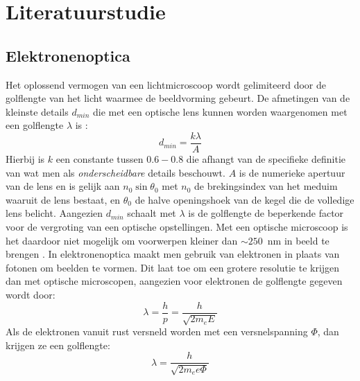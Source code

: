 \documentclass[we,twoside,openright,a4paper,11pt]{uantwerpenbamathesis}
\begin{document}
\chapter{Literatuurstudie}\label{ch:literatuur}
\section{Elektronenoptica}
Het oplossend vermogen van een lichtmicroscoop wordt gelimiteerd door de golflengte van het licht waarmee de beeldvorming gebeurt. De afmetingen van de kleinste details $d_{min}$ die met een optische lens kunnen worden waargenomen met een golflengte $\lambda$ is \cite{PWHawkes}:
\begin{equation}\label{eq:d_min}
    d_{min}=\frac{k\lambda}{A}
\end{equation}
Hierbij is $k$ een constante tussen $0.6-0.8$ die afhangt van de specifieke definitie van wat men als \textit{onderscheidbare} details beschouwt. $A$ is de numerieke apertuur van de lens en is gelijk aan $n_0\sin\theta_0$ met $n_0$ de brekingsindex van het meduim waaruit de lens bestaat, en $\theta_0$ de halve openingshoek van de kegel die de volledige lens belicht. Aangezien $d_{min}$ schaalt met $\lambda$ is de golflengte de beperkende factor voor de vergroting van een optische opstellingen. Met een optische microscoop is het daardoor niet mogelijk om voorwerpen kleiner dan $\sim250$~nm in beeld te brengen \cite{davidson_resolution_microscopyu}. In elektronenoptica maakt men gebruik van elektronen in plaats van fotonen om beelden te vormen. Dit laat toe om een grotere resolutie te krijgen dan met optische microscopen, aangezien voor elektronen de golflengte gegeven wordt door:
\begin{equation}
    \lambda=\frac{h}{p}=\frac{h}{\sqrt{2m_e E}}
\end{equation}
Als de elektronen vanuit rust versneld worden met een versnelspanning $\Phi$, dan krijgen ze een golflengte:
\begin{equation}
    \lambda=\frac{h}{\sqrt{2m_e e\Phi}}
\end{equation}
\end{document}
